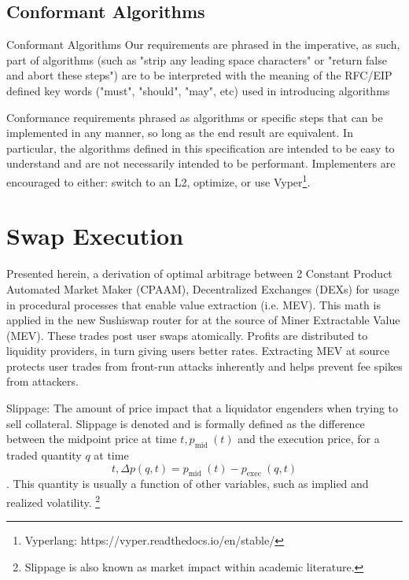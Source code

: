 \documentclass[runningheads]{llncs}
\begin{document}

\subsection{Conformant Algorithms}

Conformant Algorithms
Our requirements are phrased in the imperative, as such, part of algorithms (such as "strip any leading space characters" or "return false and abort these steps") are to be interpreted with the meaning of the RFC/EIP defined key words ("must", "should", "may", etc) used in introducing algorithms

\hfill \break

Conformance requirements phrased as algorithms or specific steps that can be implemented in any manner, so long as the end result are equivalent. In particular, the algorithms defined in this specification are intended to be easy to understand and are not necessarily intended to be performant. Implementers are encouraged to either: switch to an L2, optimize, or use Vyper\footnote{Vyperlang: https://vyper.readthedocs.io/en/stable/}.


\section{Swap Execution}


Presented herein, a derivation of optimal arbitrage between 2 Constant Product Automated Market Maker (CPAAM), Decentralized Exchanges (DEXs) for usage in procedural processes that enable value extraction (i.e. MEV).
This math is applied in the new Sushiswap router for at the source of  Miner Extractable Value (MEV). These trades post user swaps atomically.
Profits are distributed to liquidity providers, in turn giving users better rates. Extracting MEV at source protects user trades from front-run attacks inherently and helps prevent fee spikes from attackers.


Slippage: The amount of price impact that a liquidator engenders when trying to sell collateral.
Slippage is denoted  and is formally defined as the difference between the midpoint price at time $t, p_{\text {mid }}(t)$ and the execution price,   for a traded quantity $q$ at time $$t, \Delta p(q, t)=p_{\text {mid }}(t)-p_{\text {exec }}(q, t)$$. This quantity is usually a function of other variables, such as implied and realized volatility.
\footnote{Slippage is also known as market impact within academic literature.}
\end{document}
